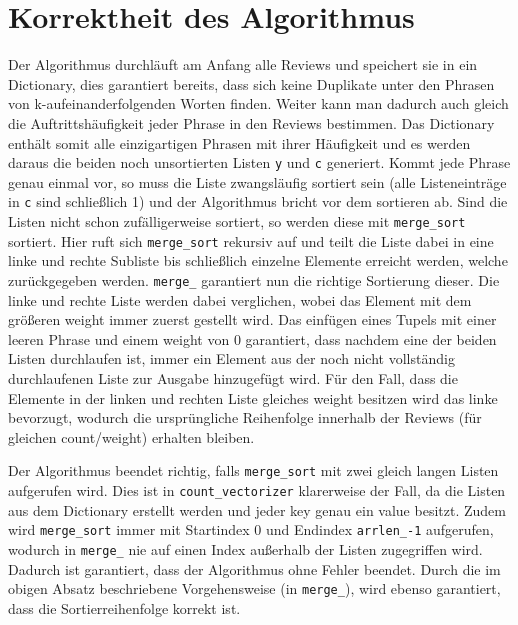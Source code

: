 \documentclass[ngerman]{scrartcl}
\newcommand{\code}{\texttt}
\begin{document}
\section{Korrektheit des Algorithmus}
\label{sec:correctness}
Der Algorithmus durchläuft am Anfang alle Reviews und speichert sie in ein Dictionary, dies garantiert bereits, dass sich keine Duplikate unter den Phrasen von k-aufeinanderfolgenden Worten finden. Weiter kann man dadurch auch gleich die Auftrittshäufigkeit jeder Phrase in den Reviews bestimmen. Das Dictionary enthält somit alle einzigartigen Phrasen mit ihrer Häufigkeit und es werden daraus die beiden noch unsortierten Listen \code{y} und \code{c} generiert. Kommt jede Phrase genau einmal vor, so muss die Liste zwangsläufig sortiert sein (alle Listeneinträge in \code{c} sind schließlich 1) und der Algorithmus bricht vor dem sortieren ab. Sind die Listen nicht schon zufälligerweise sortiert, so werden diese mit \code{merge\_sort} sortiert. Hier ruft sich \code{merge\_sort} rekursiv auf und teilt die Liste dabei in eine linke und rechte Subliste bis schließlich einzelne Elemente erreicht werden, welche zurückgegeben werden. \code{merge\_} garantiert nun die richtige Sortierung dieser. Die linke und rechte Liste werden dabei verglichen, wobei das Element mit dem größeren weight immer zuerst gestellt wird. Das einfügen eines Tupels mit einer leeren Phrase und einem weight von 0 garantiert, dass nachdem eine der beiden Listen durchlaufen ist, immer ein Element aus der noch nicht vollständig durchlaufenen Liste zur Ausgabe hinzugefügt wird. Für den Fall, dass die Elemente in der linken und rechten Liste gleiches weight besitzen wird das linke bevorzugt, wodurch die ursprüngliche Reihenfolge innerhalb der Reviews (für gleichen count/weight) erhalten bleiben. 

Der Algorithmus beendet richtig, falls \code{merge\_sort} mit zwei gleich langen Listen aufgerufen wird. Dies ist in  \code{count\_vectorizer} klarerweise der Fall, da die Listen aus dem Dictionary erstellt werden und jeder key genau ein value besitzt. Zudem wird \code{merge\_sort} immer mit Startindex $0$ und Endindex \code{arrlen\_-1} aufgerufen, wodurch in \code{merge\_} nie auf einen Index außerhalb der Listen zugegriffen wird. Dadurch ist garantiert, dass der Algorithmus ohne Fehler beendet. Durch die im obigen Absatz beschriebene Vorgehensweise (in \code{merge\_}), wird ebenso garantiert, dass die Sortierreihenfolge korrekt ist.  




\clearpage


\end{document}
